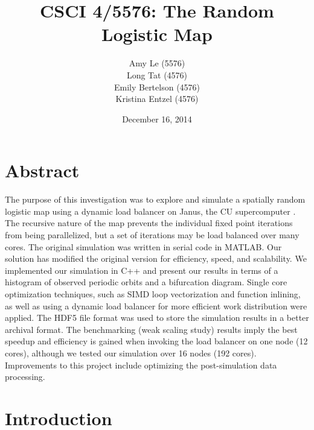 \documentclass[12pt]{article}
\begin{document}
\pagestyle{plain} %
\title{CSCI 4/5576: The Random Logistic Map}
\date{December 16, 2014}
\author{Amy Le (5576)\\Long Tat (4576)\\Emily Bertelson (4576)\\Kristina Entzel (4576)}
\maketitle
\section{Abstract}
The purpose of this investigation was to explore and simulate a
spatially random logistic map using a dynamic load balancer on Janus, the CU
supercomputer \cite{janus}. The recursive nature of the map prevents the individual
fixed point iterations from being parallelized, but a set of
iterations may be load balanced over many cores. The original simulation was written in serial code in
MATLAB. Our solution has modified the original version for efficiency,
speed, and scalability. We implemented our simulation in C++ and present our
results in terms of a histogram of observed periodic orbits and a
bifurcation diagram. Single core optimization techniques,
such as SIMD loop vectorization and function inlining, as well as
using a dynamic load balancer for more efficient work distribution
were applied. The HDF5 file format was used to store the simulation results in a better archival format. The benchmarking (weak scaling study) results imply the best
speedup and efficiency is gained when invoking the load balancer on
one node (12 cores), although we tested our simulation over 16 nodes
(192 cores). Improvements to this project include optimizing the
post-simulation data processing. 
\section{Introduction}
\end{document}
